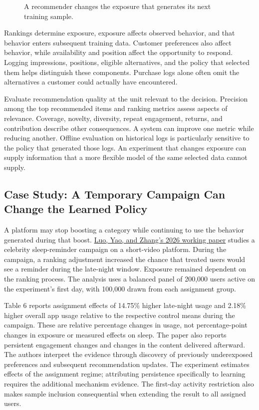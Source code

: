 \begin{figure}[htbp]
\centering

\caption{A recommender changes the exposure that generates its next training sample.}\label{fig:M08_feedback}
\end{figure}

Rankings determine exposure, exposure affects observed behavior, and
that behavior enters subsequent training data. Customer preferences also
affect behavior, while availability and position affect the opportunity
to respond. Logging impressions, positions, eligible alternatives, and
the policy that selected them helps distinguish these components.
Purchase logs alone often omit the alternatives a customer could
actually have encountered.

Evaluate recommendation quality at the unit relevant to the decision.
Precision among the top recommended items and ranking metrics assess
aspects of relevance. Coverage, novelty, diversity, repeat engagement,
returns, and contribution describe other consequences. A system can
improve one metric while reducing another. Offline evaluation on
historical logs is particularly sensitive to the policy that generated
those logs. An experiment that changes exposure can supply information
that a more flexible model of the same selected data cannot supply.

\hypertarget{M08-case-study-a-temporary-campaign-can-change-the-learned-policy}{%
\subsection{Case Study: A Temporary Campaign Can Change the Learned
Policy}\label{M08-case-study-a-temporary-campaign-can-change-the-learned-policy}}

\noindent A platform may stop boosting a category while continuing to use the
behavior generated during that boost.
\href{https://arxiv.org/abs/2606.08265}{Luo, Yao, and Zhang's 2026
working paper} studies a celebrity sleep-reminder campaign on a
short-video platform. During the campaign, a ranking adjustment
increased the chance that treated users would see a reminder during the
late-night window. Exposure remained dependent on the ranking process.
The analysis uses a balanced panel of 200,000 users active on the
experiment's first day, with 100,000 drawn from each assignment group.

Table 6 reports assignment effects of 14.75\% higher late-night usage
and 2.18\% higher overall app usage relative to the respective control
means during the campaign. These are relative percentage changes in
usage, not percentage-point changes in exposure or measured effects on
sleep. The paper also reports persistent engagement changes and changes
in the content delivered afterward. The authors interpret the evidence
through discovery of previously underexposed preferences and subsequent
recommendation updates. The experiment estimates effects of the
assignment regime; attributing persistence specifically to learning
requires the additional mechanism evidence. The first-day activity
restriction also makes sample inclusion consequential when extending the
result to all assigned users.


